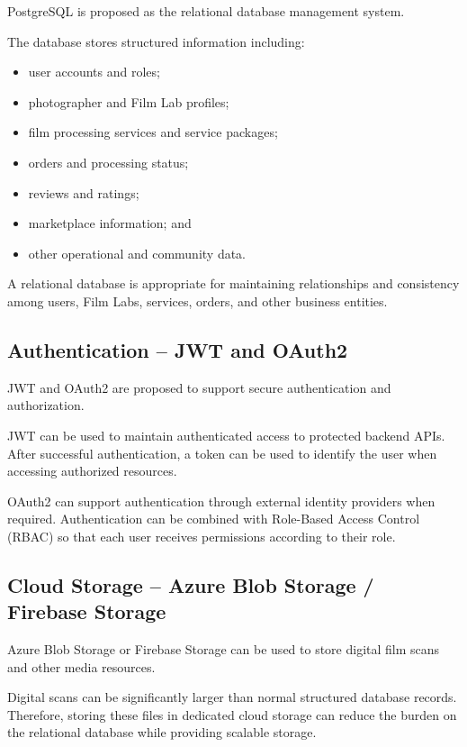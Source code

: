 PostgreSQL is proposed as the relational database management system.

The database stores structured information including:

\begin{itemize}
    \item user accounts and roles;
    \item photographer and Film Lab profiles;
    \item film processing services and service packages;
    \item orders and processing status;
    \item reviews and ratings;
    \item marketplace information; and
    \item other operational and community data.
\end{itemize}

A relational database is appropriate for maintaining relationships and
consistency among users, Film Labs, services, orders, and other business
entities.

\subsection{Authentication -- JWT and OAuth2}

JWT and OAuth2 are proposed to support secure authentication and authorization.

JWT can be used to maintain authenticated access to protected backend APIs.
After successful authentication, a token can be used to identify the user
when accessing authorized resources.

OAuth2 can support authentication through external identity providers when
required. Authentication can be combined with Role-Based Access Control
(RBAC) so that each user receives permissions according to their role.

\subsection{Cloud Storage -- Azure Blob Storage / Firebase Storage}

Azure Blob Storage or Firebase Storage can be used to store digital film
scans and other media resources.

Digital scans can be significantly larger than normal structured database
records. Therefore, storing these files in dedicated cloud storage can reduce
the burden on the relational database while providing scalable storage.

